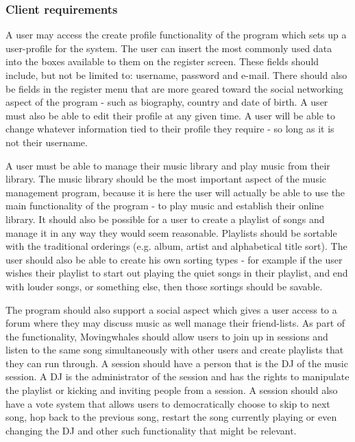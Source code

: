 \subsubsection{Client requirements}
A user may access the create profile functionality of the program which sets up a user-profile for the system. The user can insert the most commonly used data into the boxes available to them on the register screen. These fields should include, but not be limited to: username, password and e-mail. There should also be fields in the register menu that are more geared toward the social networking aspect of the program - such as biography, country and date of birth. 
A user must also be able to edit their profile at any given time. A user will be able to change whatever information tied to their profile they require - so long as it is not their username. 

A user must be able to manage their music library and play music from their library. The music library should be the most important aspect of the music management program, because it is here the user will actually be able to use the main functionality of the program - to play music and establish their online library. It should also be possible for a user to create a playlist of songs and manage it in any way they would seem reasonable. Playlists should be sortable with the traditional orderings (e.g. album, artist and alphabetical title sort). The user should also be able to create his own sorting types - for example if the user wishes their playlist to start out playing the quiet songs in their playlist, and end with louder songs, or something else, then those sortings should be savable.

The program should also support a social aspect which gives a user access to a forum where they may discuss music as well manage their friend-lists. As part of the functionality, Movingwhales should allow users to join up in sessions and listen to the same song simultaneously with other users and create playlists that they can run through. A session should have a person that is the DJ of the music session. A DJ is the administrator of the session and has the rights to manipulate the playlist or kicking and inviting people from a session. A session should also have a vote system that allows users to democratically choose to skip to next song, hop back to the previous song, restart the song currently playing or even changing the DJ and other such functionality that might be relevant.